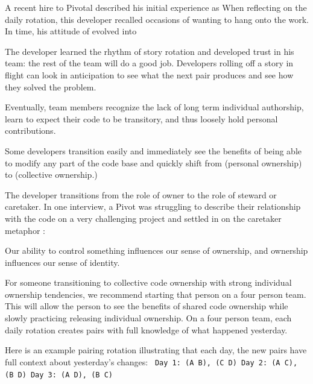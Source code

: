 \begin{table}[]
A recent hire to Pivotal described his initial experience as  When reflecting on the daily rotation, this developer recalled occasions of wanting to hang onto the work.  In time, his attitude of  evolved into  

The developer learned the rhythm of story rotation and developed trust in his team: the rest of the team will do a good job. Developers rolling off a story in flight can look in anticipation to see what the next pair produces and see how they solved the problem. 

Eventually, team members recognize the lack of long term individual authorship, learn to expect their code to be transitory, and thus loosely hold personal contributions.   

Some developers transition easily and immediately see the benefits of being able to modify any part of the code base and quickly shift from  (personal ownership) to  (collective ownership.)

The developer transitions from the role of owner to the role of steward or caretaker. In one interview, a Pivot was struggling to describe their relationship with the code on a very challenging project and settled in on the caretaker metaphor : 

Our ability to control something influences our sense of ownership, and ownership influences our sense of identity. 

For someone transitioning to collective code ownership with strong individual ownership tendencies, we recommend starting that person on a four person team. This will allow the person to see the benefits of shared code ownership while slowly practicing releasing individual ownership. On a four person team, each daily rotation creates pairs with full knowledge of what happened yesterday.  

Here is an example pairing rotation illustrating that each day, the new pairs have full context about yesterday's changes:
\texttt{
Day 1: (A B), (C D)
Day 2: (A C), (B D)
Day 3: (A D), (B C)
}


\end{table}
